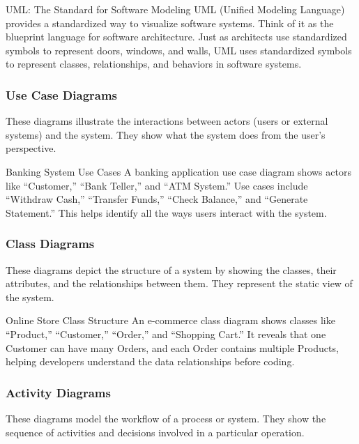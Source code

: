 \begin{conceptcard}{UML: The Standard for Software Modeling}
  UML (Unified Modeling Language) provides a standardized way to visualize software systems. Think of it as the blueprint language for software architecture. Just as architects use standardized symbols to represent doors, windows, and walls, UML uses standardized symbols to represent classes, relationships, and behaviors in software systems.
\end{conceptcard}

\subsubsection{Use Case Diagrams}

These diagrams illustrate the interactions between actors (users or external systems) and the system. They show what the system does from the user's perspective.

\begin{examplecard}{Banking System Use Cases}
  A banking application use case diagram shows actors like ``Customer,'' ``Bank Teller,'' and ``ATM System.'' Use cases include ``Withdraw Cash,'' ``Transfer Funds,'' ``Check Balance,'' and ``Generate Statement.'' This helps identify all the ways users interact with the system.
\end{examplecard}

\subsubsection{Class Diagrams}

These diagrams depict the structure of a system by showing the classes, their attributes, and the relationships between them. They represent the static view of the system.

\begin{examplecard}{Online Store Class Structure}
  An e-commerce class diagram shows classes like ``Product,'' ``Customer,'' ``Order,'' and ``Shopping Cart.'' It reveals that one Customer can have many Orders, and each Order contains multiple Products, helping developers understand the data relationships before coding.
\end{examplecard}

\subsubsection{Activity Diagrams}

These diagrams model the workflow of a process or system. They show the sequence of activities and decisions involved in a particular operation.

